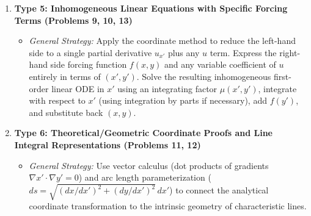 \documentclass[11pt]{article}
\begin{document}
\begin{enumerate}
    \item \textbf{Type 5: Inhomogeneous Linear Equations with Specific Forcing Terms (Problems 9, 10, 13)}
    \begin{itemize}
        \item \emph{General Strategy:} Apply the coordinate method to reduce the left-hand side to a single partial derivative $u_{x'}$ plus any $u$ term. Express the right-hand side forcing function $f(x, y)$ and any variable coefficient of $u$ entirely in terms of $(x', y')$. Solve the resulting inhomogeneous first-order linear ODE in $x'$ using an integrating factor $\mu(x', y')$, integrate with respect to $x'$ (using integration by parts if necessary), add $f(y')$, and substitute back $(x, y)$.
    \end{itemize}

    \item \textbf{Type 6: Theoretical/Geometric Coordinate Proofs and Line Integral Representations (Problems 11, 12)}
    \begin{itemize}
        \item \emph{General Strategy:} Use vector calculus (dot products of gradients $\nabla x' \cdot \nabla y' = 0$) and arc length parameterization ($ds = \sqrt{(dx/dx')^2 + (dy/dx')^2}\,dx'$) to connect the analytical coordinate transformation to the intrinsic geometry of characteristic lines.
    \end{itemize}
\end{enumerate}
\end{document}
